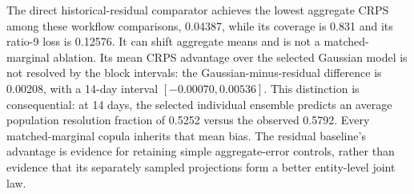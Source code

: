 The direct historical-residual comparator achieves the lowest aggregate CRPS
among these workflow comparisons, 0.04387, while its coverage is 0.831 and its
ratio-9 loss is 0.12576. It can shift aggregate means and is not a
matched-marginal ablation. Its mean CRPS advantage over the selected Gaussian
model is not resolved by the block intervals: the Gaussian-minus-residual
difference is 0.00208, with a 14-day interval $[-0.00070,0.00536]$.
This distinction is consequential: at 14 days, the
selected individual ensemble predicts an average population resolution
fraction of 0.5252 versus the observed 0.5792. Every matched-marginal copula
inherits that mean bias. The residual baseline's advantage is evidence for
retaining simple aggregate-error controls, rather than evidence that its
separately sampled projections form a better entity-level joint law.
